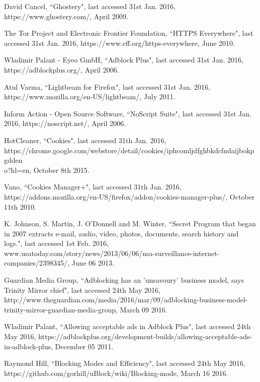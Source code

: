 \documentclass[12pt]{extarticle}
\begin{document}
\begin{thebibliography}{99}
		
		David Cancel, ``Ghostery", last accessed 31st Jan. 2016, https://www.ghostery.com/, April 2009.
		
		
		The Tor Project and Electronic Frontier Foundation, ``HTTPS Everywhere", last accessed 31st Jan. 2016, https://www.eff.org/https-everywhere, June 2010.
		
		
		Wladimir Palant - Eyeo GmbH, ``Adblock Plus", last accessed 31st Jan. 2016, https://adblockplus.org/, April 2006.
		
		
		Atul Varma, ``Lightbeam for Firefox", last accessed 31st Jan. 2016, https://www.mozilla.org/en-US/lightbeam/, July 2011.
		
		
		Inform Action -  Open Source Software, ``NoScript Suite", last accessed 31st Jan. 2016, https://noscript.net/, April 2006.
		
		
		HotCleaner, ``Cookies", last accessed 31th Jan. 2016, https://chrome.google.com/webstore/detail/cookies/iphcomljdfghbkdcfndaijbokpgdden\\o?hl=en, October 8th 2015.
		
		
		Vano, ``Cookies Manager+", last accessed 31th Jan. 2016, https://addons.mozilla.org/en-US/firefox/addon/cookies-manager-plus/, October 11th 2010.
		
		
		K. Johnson, S. Martin, J. O'Donnell and M. Winter, ``Secret Program that began in 2007 extracts e-mail, audio, video, photos, documents, search history and logs.", last accessed 1st Feb. 2016, www.usatoday.com/story/news/2013/06/06/nsa-surveillance-internet-companies/2398345/, June 06 2013.
		
		
		Guardian Media Group, ``Adblocking has an 'unsavoury' business model, says Trinity Mirror chief", last accessed 24th May 2016, http://www.theguardian.com/media/2016/mar/09/adblocking-business-model-trinity-mirror-guardian-media-group, March 09 2016.
		
		
		Wladimir Palant, ``Allowing acceptable ads in Adblock Plus", last accessed 24th May 2016, https://adblockplus.org/development-builds/allowing-acceptable-ads-in-adblock-plus, December 05 2011.
		
		
		Raymond Hill, ``Blocking Modes and Efficiency", last accessed 24th May 2016, https://github.com/gorhill/uBlock/wiki/Blocking-mode, March 16 2016.
		
	\end{thebibliography}
	
	
\end{document}
